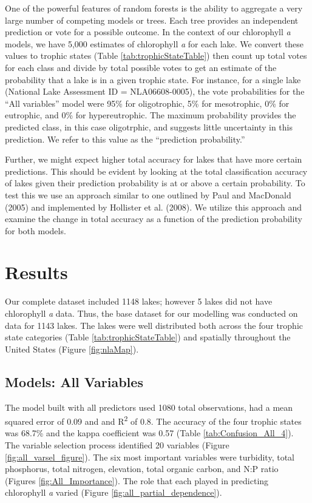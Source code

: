 \documentclass[12pt,]{article}
\begin{document}
One of the powerful features of random forests is the ability to
aggregate a very large number of competing models or trees. Each tree
provides an independent prediction or vote for a possible outcome. In
the context of our chlorophyll \emph{a} models, we have 5,000 estimates
of chlorophyll \emph{a} for each lake. We convert these values to
trophic states (Table \ref {tab:trophicStateTable}) then count up total
votes for each class and divide by total possible votes to get an
estimate of the probability that a lake is in a given trophic state. For
instance, for a single lake (National Lake Assessment ID =
NLA06608-0005), the vote probabilities for the ``All variables'' model
were 95\% for oligotrophic, 5\% for mesotrophic, 0\% for eutrophic, and
0\% for hypereutrophic. The maximum probability provides the predicted
class, in this case oligotrphic, and suggests little uncertainty in this
prediction. We refer to this value as the ``prediction probability.''

Further, we might expect higher total accuracy for lakes that have more
certain predictions. This should be evident by looking at the total
classification accuracy of lakes given their prediction probability is
at or above a certain probability. To test this we use an approach
similar to one outlined by Paul and MacDonald (2005) and implemented by
Hollister et al. (2008). We utilize this approach and examine the change
in total accuracy as a function of the prediction probability for both
models.

\section{Results}\label{results}

Our complete dataset included 1148 lakes; however 5 lakes did not have
chlorophyll \emph{a} data. Thus, the base dataset for our modelling was
conducted on data for 1143 lakes. The lakes were well distributed both
across the four trophic state categories (Table
\ref{tab:trophicStateTable}) and spatially throughout the United States
(Figure \ref{fig:nlaMap}).

\subsection{Models: All Variables}\label{models-all-variables}

The model built with all predictors used 1080 total observations, had a
mean squared error of 0.09 and and R\textsuperscript{2} of 0.8. The
accuracy of the four trophic states was 68.7\% and the kappa coefficient
was 0.57 (Table \ref{tab:Confusion_All_4}). The variable selection
process identified 20 variables (Figure \ref{fig:all_varsel_figure}).
The six most important variables were turbidity, total phosphorus, total
nitrogen, elevation, total organic carbon, and N:P ratio (Figures
\ref{fig:All_Importance}). The role that each played in predicting
chlorophyll \emph{a} varied (Figure \ref{fig:all_partial_dependence}).
\end{document}
